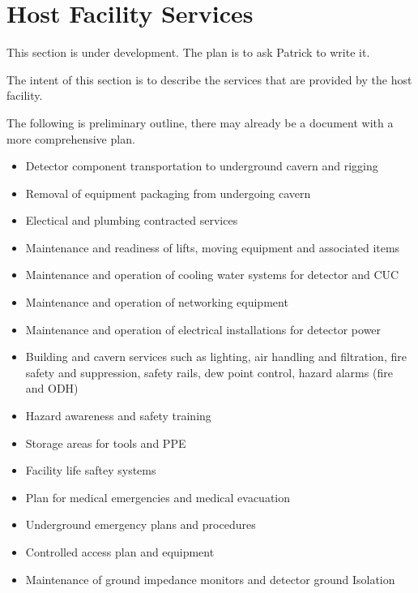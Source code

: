 \section{ Host Facility Services}
\label{sec:fdsp-coord-host_facility_services}

This section is under development. The plan is to ask Patrick to write it. 

The intent of this section is to describe the services that are provided by the host facility.

The following is preliminary outline, there may already be a document with a more comprehensive plan.
\begin{itemize}
\item Detector component transportation to underground cavern and rigging
\item Removal of equipment packaging from undergoing cavern
\item Electical and plumbing contracted services
\item Maintenance and readiness of lifts, moving equipment and associated items
\item Maintenance and operation of cooling water systems for detector and CUC
\item Maintenance and operation of networking equipment
\item Maintenance and operation of electrical installations for detector power 
\item Building and cavern services such as lighting, air handling and filtration, fire safety and suppression, safety rails, dew point control, hazard alarms (fire and ODH)
\item Hazard awareness and safety training
\item Storage areas for tools and PPE
\item Facility life saftey systems
\item Plan for medical emergencies and medical evacuation
\item Underground emergency plans and procedures
\item Controlled access plan and equipment
\item Maintenance of ground impedance monitors and detector ground Isolation
\end{itemize}

